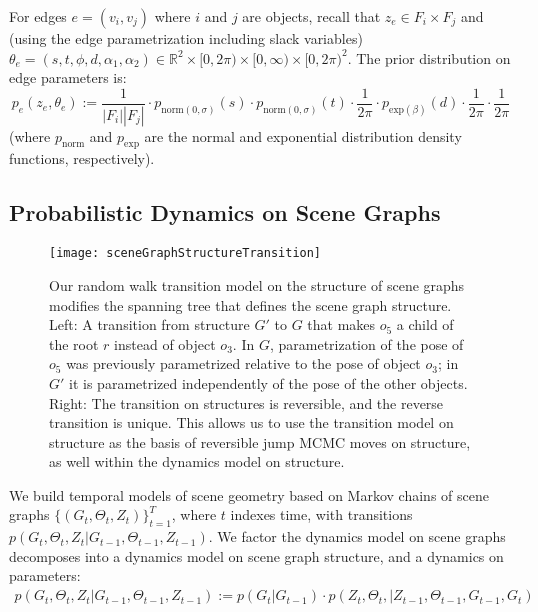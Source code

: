 For edges $e = (v_i, v_j)$ where $i$ and $j$ are objects, recall that $z_e \in F_i \times F_j$ and (using the edge parametrization including slack variables) $\theta_e = (s, t, \phi, d, \alpha_1, \alpha_2) \in \mathbb{R}^2 \times [0, 2 \pi) \times [0, \infty) \times [0, 2 \pi)^2$.
The prior distribution on edge parameters is:
\begin{equation}
    p_e(z_e, \theta_e) := \frac{1}{|F_i| |F_j|}
    \cdot p_{\mathrm{norm}(0, \sigma)}(s) \cdot p_{\mathrm{norm}(0, \sigma)}(t)
    \cdot \frac{1}{2 \pi}
    \cdot p_{\mathrm{exp}(\beta)}(d)
    \cdot \frac{1}{2 \pi}
    \cdot \frac{1}{2 \pi}
\end{equation}
(where $p_{\mathrm{norm}}$ and $p_{\mathrm{exp}}$ are the normal and exponential distribution density functions, respectively).

\subsection{Probabilistic Dynamics on Scene Graphs}
\begin{figure}[t]
  \centering
  \texttt{[image: sceneGraphStructureTransition]}
  \caption{
    Our random walk transition model on the structure of scene graphs modifies the spanning tree that defines the scene graph structure.
    Left: A transition from structure $G'$ to $G$ that makes $o_5$ a child of the root $r$ instead of object $o_3$.
    In $G$, parametrization of the pose of $o_5$ was previously parametrized relative to the pose of object $o_3$; in $G'$ it is parametrized independently of the pose of the other objects.
    Right: The transition on structures is reversible, and the reverse transition is unique.
    This allows us to use the transition model on structure as the basis of reversible jump MCMC moves on structure, as well within the dynamics model on structure.
  }
  \label{fig:sceneGraphS}
\end{figure}
We build temporal models of scene geometry based on Markov chains of scene graphs $\{(G_t, \Theta_t, Z_t)\}_{t=1}^T$, where $t$ indexes time, with transitions $p(G_t, \Theta_t, Z_t | G_{t-1}, \Theta_{t-1}, Z_{t-1})$.
We factor the dynamics model on scene graphs decomposes into a dynamics model on scene graph structure, and a dynamics on parameters:
\begin{align}
    p(G_t, \Theta_t, Z_t | G_{t-1}, \Theta_{t-1}, Z_{t-1}) :=
        p(G_t | G_{t-1})
        \cdot p(Z_t, \Theta_t, | Z_{t-1}, \Theta_{t-1}, G_{t-1}, G_t)
\end{align}
